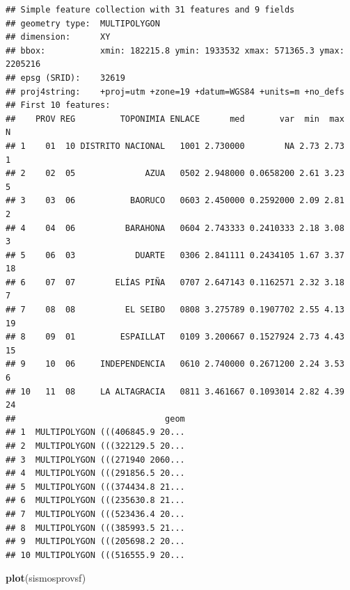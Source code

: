 \documentclass[11pt,]{article}
\newenvironment{Shaded}{\begin{snugshade}}{\end{snugshade}}
\newcommand{\KeywordTok}[1]{\textcolor[rgb]{0.13,0.29,0.53}{\textbf{#1}}}
\newcommand{\DataTypeTok}[1]{\textcolor[rgb]{0.13,0.29,0.53}{#1}}
\newcommand{\StringTok}[1]{\textcolor[rgb]{0.31,0.60,0.02}{#1}}
\newcommand{\OperatorTok}[1]{\textcolor[rgb]{0.81,0.36,0.00}{\textbf{#1}}}
\newcommand{\NormalTok}[1]{#1}
\begin{document}
\begin{Shaded}
\end{Shaded}

\begin{verbatim}
## Simple feature collection with 31 features and 9 fields
## geometry type:  MULTIPOLYGON
## dimension:      XY
## bbox:           xmin: 182215.8 ymin: 1933532 xmax: 571365.3 ymax: 2205216
## epsg (SRID):    32619
## proj4string:    +proj=utm +zone=19 +datum=WGS84 +units=m +no_defs
## First 10 features:
##    PROV REG         TOPONIMIA ENLACE      med       var  min  max  N
## 1    01  10 DISTRITO NACIONAL   1001 2.730000        NA 2.73 2.73  1
## 2    02  05              AZUA   0502 2.948000 0.0658200 2.61 3.23  5
## 3    03  06           BAORUCO   0603 2.450000 0.2592000 2.09 2.81  2
## 4    04  06          BARAHONA   0604 2.743333 0.2410333 2.18 3.08  3
## 5    06  03            DUARTE   0306 2.841111 0.2434105 1.67 3.37 18
## 6    07  07        ELÍAS PIÑA   0707 2.647143 0.1162571 2.32 3.18  7
## 7    08  08          EL SEIBO   0808 3.275789 0.1907702 2.55 4.13 19
## 8    09  01         ESPAILLAT   0109 3.200667 0.1527924 2.73 4.43 15
## 9    10  06     INDEPENDENCIA   0610 2.740000 0.2671200 2.24 3.53  6
## 10   11  08     LA ALTAGRACIA   0811 3.461667 0.1093014 2.82 4.39 24
##                              geom
## 1  MULTIPOLYGON (((406845.9 20...
## 2  MULTIPOLYGON (((322129.5 20...
## 3  MULTIPOLYGON (((271940 2060...
## 4  MULTIPOLYGON (((291856.5 20...
## 5  MULTIPOLYGON (((374434.8 21...
## 6  MULTIPOLYGON (((235630.8 21...
## 7  MULTIPOLYGON (((523436.4 20...
## 8  MULTIPOLYGON (((385993.5 21...
## 9  MULTIPOLYGON (((205698.2 20...
## 10 MULTIPOLYGON (((516555.9 20...
\end{verbatim}

\begin{Shaded}
\begin{Highlighting}[]
\KeywordTok{plot}\NormalTok{(sismosprovsf)}
\end{Highlighting}
\end{Shaded}
\end{document}
